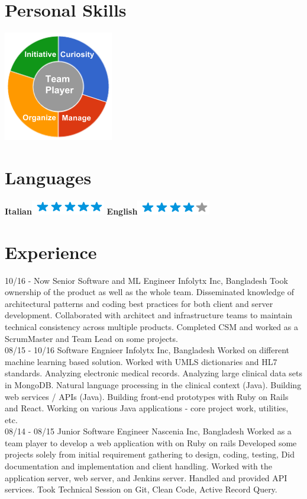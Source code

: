 \documentclass[]{friggeri-cv}
\begin{document}
\begin{aside}
  \section{Personal Skills}
    \includegraphics[scale=0.62]{img/personal.png}
    ~
  \section{Languages}
    \textbf{Italian}\includegraphics[scale=0.40]{img/5stars.png}
    \textbf{English}\includegraphics[scale=0.40]{img/4stars.png}
    ~
\end{aside}

\section{Experience}
\begin{entrylist}
  \entry
    {10/16 - Now}
    {Senior Software and ML Engineer}
    {Infolytx Inc, Bangladesh}
    {Took ownership of the product as well as the whole team.
    Disseminated knowledge of architectural patterns and coding best practices for both client and server development.
Collaborated with architect and infrastructure teams to maintain technical consistency across multiple products.
Completed CSM and worked as a ScrumMaster and Team Lead on some projects.\\}
    \entry
    {08/15 - 10/16}
    {Software Engnieer}
    {Infolytx Inc, Bangladesh}
    {Worked on different machine learning based solution.
Worked with UMLS dictionaries and HL7 standards.
Analyzing electronic medical records.
Analyzing large clinical data sets in MongoDB.
Natural language processing in the clinical context (Java).
Building web services / APIs (Java).
Building front-end prototypes with Ruby on Rails and React. 
Working on various Java applications - core project work, utilities, etc.
\\}
    \entry
    {08/14 - 08/15}
    {Junior Software Engineer}
    {Nascenia Inc, Bangladesh}
    {Worked as a team player to develop a web application with on Ruby on rails
Developed some projects solely from initial requirement gathering to design, coding, testing,
Did documentation and implementation and client handling.
Worked with the application server, web server, and Jenkins server.
Handled and provided API services. 
Took Technical Session on Git, Clean Code, Active Record Query. \\}
\end{entrylist}
\end{document}
